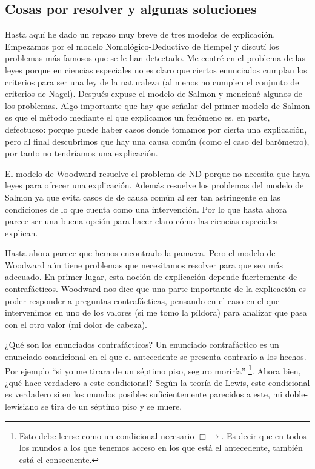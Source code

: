 \subsection{Cosas por resolver y algunas soluciones}

\noindent Hasta aquí he dado un repaso muy breve de tres modelos de explicación. Empezamos por el modelo Nomológico-Deductivo de Hempel y discutí los problemas más famosos que se le han detectado. Me centré en el problema de las leyes porque en ciencias especiales no es claro que ciertos enunciados cumplan los criterios para ser una ley de la naturaleza (al menos no cumplen el conjunto de criterios de Nagel). Después expuse el modelo de Salmon y mencioné algunos de los problemas. Algo importante que hay que señalar del primer modelo de Salmon es que el método mediante el que explicamos un fenómeno es, en parte, defectuoso: porque puede haber casos donde tomamos por cierta una explicación, pero al final descubrimos que hay una causa común (como el caso del barómetro), por tanto no tendríamos una explicación.

El modelo de Woodward resuelve el problema de ND porque no necesita que haya leyes para ofrecer una explicación. Además resuelve los problemas del modelo de Salmon ya que evita casos de de causa común al ser tan astringente en las condiciones de lo que cuenta como una intervención. Por lo que hasta ahora parece ser una buena opción para hacer claro cómo las ciencias especiales explican.

Hasta ahora parece que hemos encontrado la panacea. Pero el modelo de Woodward aún tiene problemas que necesitamos resolver para que sea más adecuado. En primer lugar, esta noción de explicación depende fuertemente de contrafácticos. Woodward nos dice que una parte importante de la explicación es poder responder a preguntas contrafácticas, pensando en el caso en el que intervenimos en uno de los valores (si me tomo la píldora) para analizar que pasa con el otro valor (mi dolor de cabeza).

¿Qué son los enunciados contrafácticos? Un enunciado contrafáctico es un enunciado condicional en el que el antecedente se presenta contrario a los hechos. Por ejemplo ``si yo me tirara de un séptimo piso, seguro moriría'' \footnote{Esto debe leerse como un condicional necesario $\Box\to$. Es decir que en todos los mundos a los que tenemos acceso en los que está el antecedente, también está el consecuente.}. Ahora bien, ¿qué hace verdadero a este condicional? Según la teoría de Lewis, este condicional es verdadero si en los mundos posibles suficientemente parecidos a este, mi doble-lewisiano se tira de un séptimo piso y se muere.

